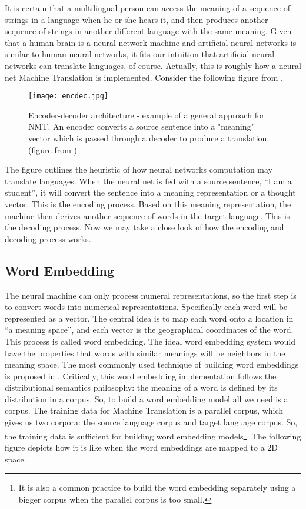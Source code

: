 It is certain that a multilingual person can access the meaning of a sequence of strings in a language when he or she hears it, and then produces another sequence of strings in another different language with the same meaning. Given that a human brain is a neural network machine and artificial neural networks is similar to human neural networks, it fits our intuition that artificial neural networks can translate languages, of course. Actually, this is roughly how a neural net Machine Translation is implemented. Consider the following figure from \citet{luong17GitHub}.

\begin{figure}[h]
\caption{Encoder-decoder architecture - example of a general approach for NMT. An encoder converts a source sentence into a "meaning" vector which is passed through a decoder to produce a translation. (figure from \citet{luong17GitHub})}
\centering
\texttt{[image: encdec.jpg]}
\end{figure} 

The figure outlines the heuristic of how neural networks computation may translate languages. When the neural net is fed with a source sentence, ``I am a student'', it will convert the sentence into a meaning representation or a thought vector. This is the encoding process. Based on this meaning representation, the machine then derives another sequence of words in the target language. This is the decoding process. Now we may take a close look of how the encoding and decoding process works. 

\subsection{Word Embedding}
The neural machine can only process numeral representations, so the first step is to convert words into numerical representations. Specifically each word will be represented as a vector. The central idea is to map each word onto a location in ``a meaning space'', and each vector is the geographical coordinates of the word. 
This process is called word embedding. The ideal word embedding system would have the properties that words with similar meanings will be neighbors in the meaning space. 
The most commonly used technique of building word embeddings is proposed in \citet{mikolov2013efficient, mikolov2013distributed}. Critically, this word embedding implementation follows the distributional semantics philosophy: the meaning of a word is defined by its distribution in a corpus. So, to build a word embedding model all we need is a corpus. The training data for Machine Translation is a parallel corpus, which gives us two corpora: the source language corpus and target language corpus. So, the training data is sufficient for building word embedding models\footnote{It is also a common practice to build the word embedding separately using a bigger corpus when the parallel corpus is too small.}. The following figure depicts how it is like when the word embeddings are mapped to a 2D space.   

